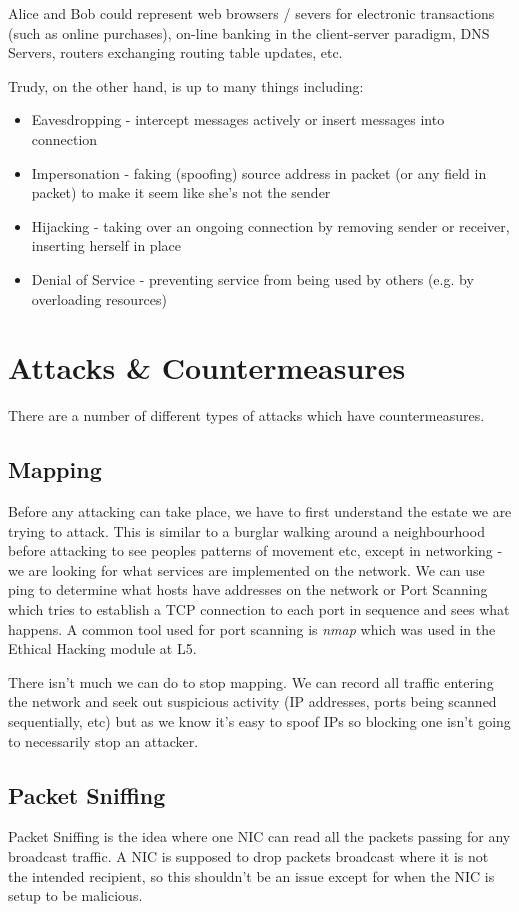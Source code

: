 Alice and Bob could represent web browsers / severs for electronic transactions (such as online purchases), on-line banking in the client-server paradigm, DNS Servers, routers exchanging routing table updates, etc. 

Trudy, on the other hand, is up to many things including:
\begin{itemize}
    \item Eavesdropping - intercept messages actively or insert messages into connection
    \item Impersonation - faking (spoofing) source address in packet (or any field in packet) to make it seem like she's not the sender
    \item Hijacking - taking over an ongoing connection by removing sender or receiver, inserting herself in place
    \item Denial of Service - preventing service from being used by others (e.g. by overloading resources)
\end{itemize}

\section{Attacks \& Countermeasures}
There are a number of different types of attacks which have countermeasures.

\subsection{Mapping}
Before any attacking can take place, we have to first understand the estate we are trying to attack. This is similar to a burglar walking around a neighbourhood before attacking to see peoples patterns of movement etc, except in networking - we are looking for what services are implemented on the network. We can use ping to determine what hosts have addresses on the network or Port Scanning which tries to establish a TCP connection to each port in sequence and sees what happens. A common tool used for port scanning is \textit{nmap} which was used in the Ethical Hacking module at L5.

There isn't much we can do to stop mapping. We can record all traffic entering the network and seek out suspicious activity (IP addresses, ports being scanned sequentially, etc) but as we know it's easy to spoof IPs so blocking one isn't going to necessarily stop an attacker. 

\subsection{Packet Sniffing}
Packet Sniffing is the idea where one NIC can read all the packets passing for any broadcast traffic. A NIC is supposed to drop packets broadcast where it is not the intended recipient, so this shouldn't be an issue except for when the NIC is setup to be malicious. 

